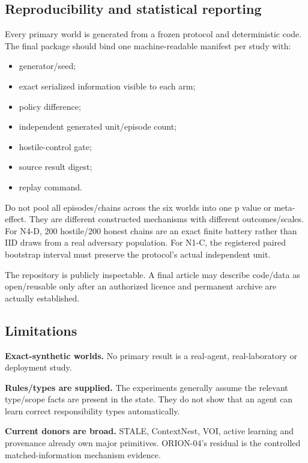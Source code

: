 \documentclass[10pt]{article}
\providecommand{\tightlist}{%
  \setlength{\itemsep}{0pt}\setlength{\parskip}{0pt}}
\begin{document}
\hypertarget{reproducibility-and-statistical-reporting}{%
\subsection{Reproducibility and statistical
reporting}\label{reproducibility-and-statistical-reporting}}

Every primary world is generated from a frozen protocol and
deterministic code. The final package should bind one machine-readable
manifest per study with:

\begin{itemize}
\tightlist
\item
  generator/seed;
\item
  exact serialized information visible to each arm;
\item
  policy difference;
\item
  independent generated unit/episode count;
\item
  hostile-control gate;
\item
  source result digest;
\item
  replay command.
\end{itemize}

Do not pool all episodes/chains across the six worlds into one p value
or meta-effect. They are different constructed mechanisms with different
outcomes/scales. For N4-D, 200 hostile/200 honest chains are an exact
finite battery rather than IID draws from a real adversary population.
For N1-C, the registered paired bootstrap interval must preserve the
protocol's actual independent unit.

The repository is publicly inspectable. A final article may describe
code/data as open/reusable only after an authorized licence and
permanent archive are actually established.

\hypertarget{limitations}{%
\subsection{Limitations}\label{limitations}}

\textbf{Exact-synthetic worlds.} No primary result is a real-agent,
real-laboratory or deployment study.

\textbf{Rules/types are supplied.} The experiments generally assume the
relevant type/scope facts are present in the state. They do not show
that an agent can learn correct responsibility types automatically.

\textbf{Current donors are broad.} STALE, ContextNest, VOI, active
learning and provenance already own major primitives. ORION-04's
residual is the controlled matched-information mechanism evidence.
\end{document}

